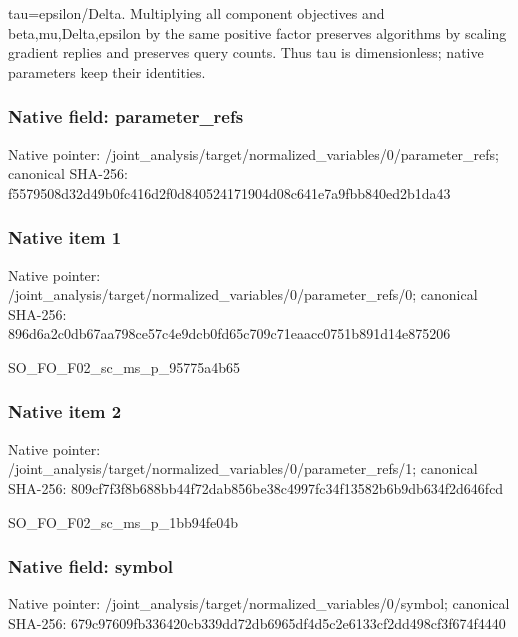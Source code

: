 \documentclass[10pt,a4paper]{article}
\begin{document}
\begingroup\raggedright\sloppy tau=\allowbreak{}epsilon/\allowbreak{}Delta. Multiplying all component objectives and beta,\allowbreak{}mu,\allowbreak{}Delta,\allowbreak{}epsilon by the same positive factor preserves algorithms by scaling gradient replies and preserves query counts. Thus tau is dimensionless;\allowbreak{} native parameters keep their identities.\par\endgroup

\subsubsection{Native field: parameter\_\allowbreak{}refs}
Native pointer: /joint\_\allowbreak{}analysis/target/normalized\_\allowbreak{}variables/0/parameter\_\allowbreak{}refs; canonical SHA-256: f5579508d32d49b0fc416d2f0d840524171904d08c641e7a9fbb840ed2b1da43

\subsubsection{Native item 1}
Native pointer: /joint\_\allowbreak{}analysis/target/normalized\_\allowbreak{}variables/0/parameter\_\allowbreak{}refs/0; canonical SHA-256: 896d6a2c0db67aa798ce57c4e9dcb0fd65c709c71eaacc0751b891d14e875206

\begingroup\raggedright\sloppy SO\_\allowbreak{}FO\_\allowbreak{}F02\_\allowbreak{}sc\_\allowbreak{}ms\_\allowbreak{}p\_\allowbreak{}95775a4b65\par\endgroup

\subsubsection{Native item 2}
Native pointer: /joint\_\allowbreak{}analysis/target/normalized\_\allowbreak{}variables/0/parameter\_\allowbreak{}refs/1; canonical SHA-256: 809cf7f3f8b688bb44f72dab856be38c4997fc34f13582b6b9db634f2d646fcd

\begingroup\raggedright\sloppy SO\_\allowbreak{}FO\_\allowbreak{}F02\_\allowbreak{}sc\_\allowbreak{}ms\_\allowbreak{}p\_\allowbreak{}1bb94fe04b\par\endgroup

\subsubsection{Native field: symbol}
Native pointer: /joint\_\allowbreak{}analysis/target/normalized\_\allowbreak{}variables/0/symbol; canonical SHA-256: 679c97609fb336420cb339dd72db6965df4d5c2e6133cf2dd498cf3f674f4440
\end{document}
